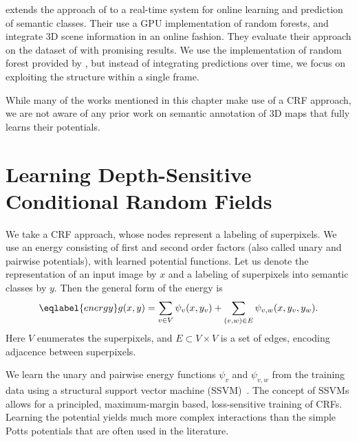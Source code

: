 \citet{stueckler2013} extends the approach of \citet{stuckler2012semantic} to
a real-time system for online learning and prediction of semantic classes. Their
use a GPU implementation of random forests, and integrate 3D scene information
in an online fashion. They evaluate their approach on the dataset of
\citet{SilbermanECCV12} with promising results.
We use the implementation of random forest provided by
\citet{stueckler2013}, but instead of integrating predictions over time, we
focus on exploiting the structure within a single frame.

While many of the works mentioned in this chapter make use of a CRF
approach, we are not aware of any prior work on semantic annotation of 3D maps
that fully learns their potentials.



\section{Learning Depth-Sensitive Conditional Random Fields}
We take a CRF approach, whose nodes represent a labeling of
superpixels.  We use an energy consisting of first and second order factors
(also called unary and pairwise potentials), with learned potential functions.
Let us denote the representation of an input image by $x$ and a labeling of
superpixels into semantic classes by $y$.  Then the general form of the energy is
\begin{equation}\eqlabel{energy}
    g(x, y) = \sum_{v \in V} \psi_v(x, y_v) + \sum_{(v, w) \in E} \psi_{v,w}(x, y_{v}, y_{w}).
\end{equation}
Here $V$ enumerates the superpixels, and $E\subset V \times V$ is a set of
edges, encoding adjacence between superpixels.

We learn the unary and pairwise energy functions $\psi_v$ and $\psi_{v, w}$ from the training data
using a structural support vector machine (SSVM)~\citep{joachims2009cutting}. 
The concept of SSVMs allows for a principled,
maximum-margin based, loss-sensitive training of CRFs. Learning the potential yields much
more complex interactions than the simple Potts potentials that are often used in the literature.

